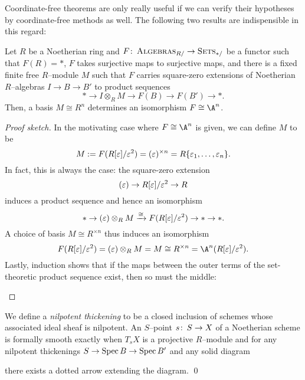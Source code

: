 Coordinate-free theorems are only really useful if we can verify their hypotheses by coordinate-free methods as well.  The following two results are indispensible in this regard:
\begin{theorem}\label{DetectingFormalVarieties}
Let \(R\) be a Noetherian ring and \(F\colon\thinspace \normalfont\textsc{Algebras}_{R/} \to \normalfont\textsc{Sets}_{*/}\) be a functor such that \(F(R) = *\), \(F\) takes surjective maps to surjective maps, and there is a fixed finite free \(R\)--module \(M\) such that \(F\) carries square-zero extensions of Noetherian \(R\)--algebras \(I \to B \to B'\) to product sequences \[* \to I \otimes_R M \to F(B) \to F(B') \to *.\]  Then, a basis \(M \cong R^n\) determines an isomorphism \(F \cong \A^n\).
\end{theorem}
\begin{proof}[Proof sketch]
In the motivating case where \(F \cong \A^n\) is given, we can define \(M\) to be \[M := F(R[\varepsilon] / \varepsilon^2) = (\varepsilon)^{\times n} = R\{\varepsilon_1, \ldots, \varepsilon_n\}.\]  In fact, this is always the case: the square-zero extension \[(\varepsilon) \to R[\varepsilon] / \varepsilon^2 \to R\] induces a product sequence and hence an isomorphism \[* \to (\varepsilon) \otimes_R M \xrightarrow{\cong} F(R[\varepsilon] / \varepsilon^2) \to * \to *.\]  A choice of basis \(M \cong R^{\times n}\) thus induces an isomorphism \[F(R[\eps] / \eps^2) = (\eps) \otimes_R M = M \cong R^{\times n} = \A^n(R[\eps] / \eps^2).\]  Lastly, induction shows that if the maps between the outer terms of the set-theoretic product sequence exist, then so must the middle:
\begin{center}
\end{center}
\vspace{-\baselineskip}
\end{proof}

\begin{corollary}
We define a \textit{nilpotent thickening} to be a closed inclusion of schemes whose associated ideal sheaf is nilpotent.  An \(S\)--point \(s\colon\thinspace S \to X\) of a Noetherian scheme is formally smooth exactly when \(T_s X\) is a projective \(R\)--module and for any nilpotent thickenings \(S \to \operatorname{Spec} B \to \operatorname{Spec} B'\) and any solid diagram
\begin{center}
\end{center}
there exists a dotted arrow extending the diagram. \qed
\end{corollary}


